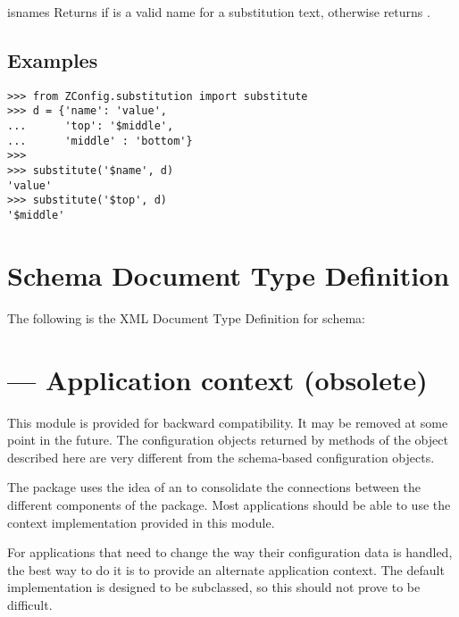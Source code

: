 \documentclass{howto}
\begin{document}
\begin{funcdesc}{isname}{s}
  Returns  if  is a valid name for a substitution
  text, otherwise returns .
\end{funcdesc}


\subsection{Examples}

\begin{verbatim}
>>> from ZConfig.substitution import substitute
>>> d = {'name': 'value',
...      'top': '$middle',
...      'middle' : 'bottom'}
>>>
>>> substitute('$name', d)
'value'
>>> substitute('$top', d)
'$middle'
\end{verbatim}


\appendix
\section{Schema Document Type Definition \label{schema-dtd}}

The following is the XML Document Type Definition for 
schema:





\section{ --- Application context (obsolete)}


\begin{notice}[warning]
  This module is provided for backward compatibility.  It may be
  removed at some point in the future.  The configuration objects
  returned by methods of the  object described here are
  very different from the schema-based configuration objects.
\end{notice}

The  package uses the idea of an  to consolidate the connections between the different
components of the package.  Most applications should be able to use
the context implementation provided in this module.

For applications that need to change the way their configuration data
is handled, the best way to do it is to provide an alternate
application context.  The default implementation is designed to be
subclassed, so this should not prove to be difficult.
\end{document}
